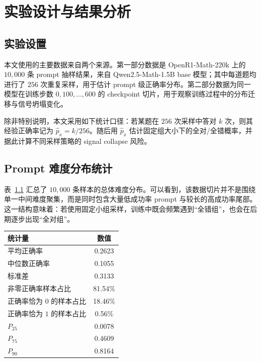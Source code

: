 \chapter{实验设计与结果分析}\label{chap:experiment}

\section{实验设置}

本文使用的主要数据来自两个来源。第一部分数据是 OpenR1-Math-220k 上的 $10{,}000$ 条 prompt 抽样结果，来自 Qwen2.5-Math-1.5B base 模型；其中每道题均进行了 $256$ 次重复采样，用于估计 prompt 级正确率分布。第二部分数据为同一模型在训练步数 $0,100,\ldots,600$ 的 checkpoint 切片，用于观察训练过程中的分布迁移与信号坍塌变化。

除非特别说明，本文采用如下统计口径：若某题在 $256$ 次采样中答对 $k$ 次，则其经验正确率记为 $\hat p_x=k/256$。随后用 $\hat p_x$ 估计固定组大小下的全对/全错概率，并据此计算不同采样策略的 signal collapse 风险。

\section{Prompt 难度分布统计}

表~\ref{tab:dist_summary} 汇总了 $10{,}000$ 条样本的总体难度分布。可以看到，该数据切片并不是围绕单一中间难度聚集，而是同时包含大量低成功率 prompt 与较长的高成功率尾部。这一结构意味着：若使用固定小组采样，训练中既会频繁遇到“全错组”，也会在后期逐步出现“全对组”。

\begin{table}[!htbp]
    \label{tab:dist_summary}
    \centering
    \small
    \begin{tabular}{lc}
        \hline
        统计量 & 数值 \\
        \hline
        平均正确率 & 0.2623 \\
        中位数正确率 & 0.1055 \\
        标准差 & 0.3133 \\
        非零正确率样本占比 & 81.54\% \\
        正确率恰为 $0$ 的样本占比 & 18.46\% \\
        正确率恰为 $1$ 的样本占比 & 0.56\% \\
        $P_{25}$ & 0.0078 \\
        $P_{75}$ & 0.4609 \\
        $P_{90}$ & 0.8164 \\
        \hline
    \end{tabular}
\end{table}


